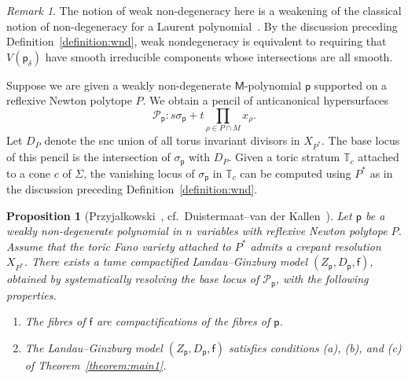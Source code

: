 \documentclass[10pt]{amsart}
\numberwithin{equation}{section}
\theoremstyle{plain}
\newtheorem{proposition}[theorem]{Proposition}
\theoremstyle{definition}
\theoremstyle{remark}
\newtheorem{remark}[theorem]{Remark}
\begin{document}
\begin{remark}
  The notion of weak non-degeneracy here is a weakening of the classical notion of non-degeneracy for a Laurent polynomial~\cite{danilov1987newton}. By the discussion preceding Definition~\ref{definition:wnd}, weak nondegeneracy is equivalent to requiring that \(V(\mathsf{p}_\delta)\) have smooth irreducible components whose intersections are all smooth.
\end{remark}

Suppose we are given a weakly non-degenerate \(\mathsf{M}\)-polynomial \(\mathsf{p}\) supported on a reflexive Newton polytope \(P\). We obtain a pencil of anticanonical hypersurfaces
\begin{equation}\label{equation:pencil}
\mathscr{P}_\mathsf{p}: s\sigma_\mathsf{p}  + t \prod_{\rho \in P\cap M} x_\rho.
\end{equation}
Let \(D_P\) denote the snc union of all torus invariant divisors in \(X_{P^*}\). The base locus of this pencil is the intersection of \(\sigma_\mathsf{p}\) with \(D_P\). Given a toric stratum \(\mathbb{T}_c\) attached to a cone \(c\) of \(\Sigma\), the vanishing locus of \(\sigma_\mathsf{p}\) in \(\mathbb{T}_c\) can be computed using \(P^*\) as in the discussion preceding Definition~\ref{definition:wnd}.

\begin{proposition}[Przyjalkowski~\cite{przyjalkowski2017compactification}, cf.~Duistermaat--van der Kallen~{\cite[Theorem 4]{duistermaat1998constant}}]\label{proposition:prz}
  Let \(\mathsf{p}\) be a weakly non-degenerate polynomial in \(n\) variables with reflexive Newton polytope \(P\). Assume that the toric Fano variety attached to \(P^*\) admits a crepant resolution \(X_{P^*}\). There exists a tame compactified Landau--Ginzburg model \((Z_\mathsf{p},D_\mathsf{p},\mathsf{f})\), obtained by systematically resolving the base locus of \(\mathscr{P}_\mathsf{p}\), with the following properties.
  \begin{enumerate}
  \item The fibres of \(\mathsf{f}\) are compactifications of the fibres of \(\mathsf{p}\).
  \item The Landau--Ginzburg model \((Z_\mathsf{p},D_\mathsf{p},\mathsf{f})\) satisfies conditions (a), (b), and (c) of Theorem~\ref{theorem:main1}.
  \end{enumerate}
\end{proposition}
\end{document}
